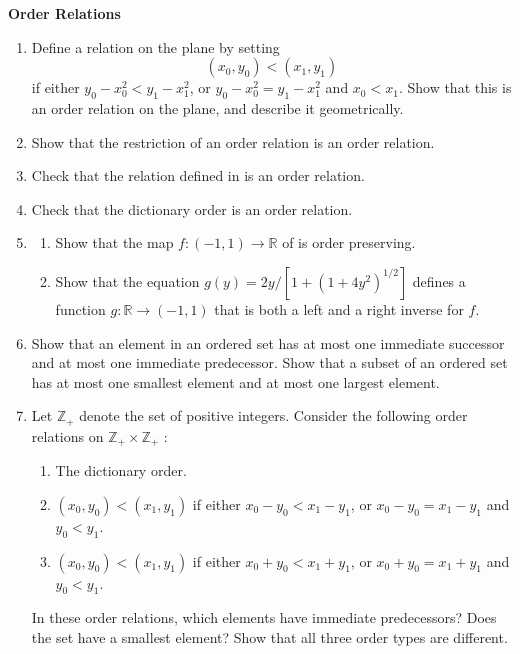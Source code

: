 \noindent\textbf{Order Relations}
\begin{enumerate}[itemsep=0.4em, parsep=0pt, topsep=0pt, partopsep=0pt, leftmargin=*, label=\arabic*., ref=\arabic*, resume]
\item Define a relation on the plane by setting \[ ({x_{0},y_{0}}) < ({x_{1},y_{1}}) \] if either \(y_{0} - x_0^{2} < y_{1} - x_1^{2}\), or \(y_{0} - x_0^{2} = y_{1} - x_1^{2}\) and \(x_{0} < x_{1}\). Show that this is an order relation on the plane, and describe it geometrically.
\item Show that the restriction of an order relation is an order relation.
\item Check that the relation defined in  is an order relation.
\item Check that the dictionary order is an order relation.
\item
\begin{enumerate}[itemsep=0.2em, parsep=0pt, topsep=0pt, partopsep=0pt, leftmargin=*, label=(\alph*), align=left]
  \item Show that the map \(f : ({-1,1}) \rightarrow \mathbb{R}\) of  is order preserving.
  \item Show that the equation \(g( y) = {2y}/[{1 + {( 1 + 4y^{2}) }^{1/2}}]\) defines a function \(g : \mathbb{R} \rightarrow ({-1,1})\) that is both a left and a right inverse for \(f\).
  \end{enumerate}
\item Show that an element in an ordered set has at most one immediate successor and at most one immediate predecessor. Show that a subset of an ordered set has at most one smallest element and at most one largest element.
\item Let \(\mathbb{Z}_{+}\) denote the set of positive integers. Consider the following order relations on \(\mathbb{Z}_{+} \times {\mathbb{Z}}_{+}\) :
  \begin{enumerate}[itemsep=0.2em, parsep=0pt, topsep=0pt, partopsep=0pt, leftmargin=*, label=(\roman*), align=left]
  \item The dictionary order.
  \item \(({x_{0},y_{0}}) < ({x_{1},y_{1}})\) if either \(x_{0} - y_{0} < x_{1} - y_{1}\), or \(x_{0} - y_{0} = x_{1} - y_{1}\) and \(y_{0} < y_{1}\).
  \item \(({x_{0},y_{0}}) < ({x_{1},y_{1}})\) if either \(x_{0} + y_{0} < x_{1} + y_{1}\), or \(x_{0} + y_{0} = x_{1} + y_{1}\) and \(y_{0} < y_{1}\).
  \end{enumerate}
 In these order relations, which elements have immediate predecessors? Does the set have a smallest element? Show that all three order types are different.

\end{enumerate}
